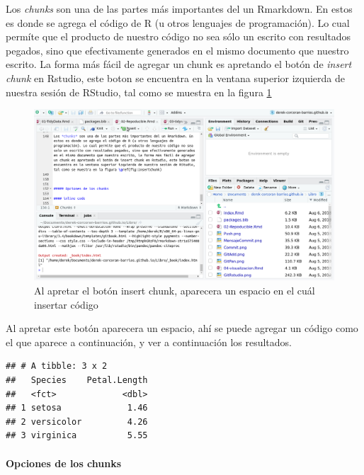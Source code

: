 \documentclass[]{book}
\newenvironment{Shaded}{\begin{snugshade}}{\end{snugshade}}
\newcommand{\NormalTok}[1]{#1}
\let\oldparagraph\paragraph
\renewcommand{\paragraph}[1]{\oldparagraph{#1}\mbox{}}
\begin{document}
Los \emph{chunks} son una de las partes más importantes del un
Rmarkdown. En estos es donde se agrega el código de R (u otros lenguajes
de programación). Lo cual permíte que el producto de nuestro código no
sea sólo un escrito con resultados pegados, sino que efectivamente
generados en el mismo documento que nuestro escrito. La forma más fácil
de agregar un chunk es apretando el botón de \emph{insert chunk} en
Rstudio, este boton se encuentra en la ventana superior izquierda de
nuestra sesión de RStudio, tal como se muestra en la figura
\ref{fig:Insertchunk}

\begin{figure}

{\centering \includegraphics[width=0.8\linewidth]{Insertchunk} 

}

\caption{Al apretar el botón insert chunk, aparecera un espacio en el cuál insertar código}\label{fig:Insertchunk}
\end{figure}

Al apretar este botón aparecera un espacio, ahí se puede agregar un
código como el que aparece a continuación, y ver a continuación los
resultados.

\begin{Shaded}
\end{Shaded}

\begin{verbatim}
## # A tibble: 3 x 2
##   Species    Petal.Length
##   <fct>             <dbl>
## 1 setosa             1.46
## 2 versicolor         4.26
## 3 virginica          5.55
\end{verbatim}

\hypertarget{opciones-de-los-chunks}{%
\paragraph{Opciones de los chunks}\label{opciones-de-los-chunks}}
\end{document}
